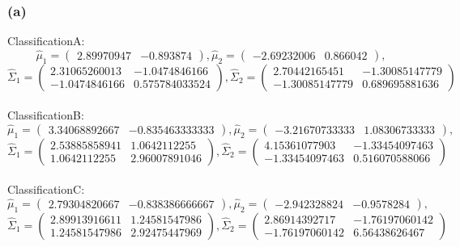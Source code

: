 \documentclass[9pt]{article}
\begin{document}
\subsubsection{(a)}
ClassificationA:
\[
\hat{\mu}_{1} =
  \begin{pmatrix}
    2.89970947 & -0.893874
  \end{pmatrix}, 
\hat{\mu}_{2} =
  \begin{pmatrix}
    -2.69232006 & 0.866042
  \end{pmatrix}, 
\]
\[
\hat{\Sigma}_{1} =
  \begin{pmatrix}
    2.31065260013 & -1.0474846166\\-1.0474846166 & 0.575784033524
  \end{pmatrix}, 
\hat{\Sigma}_{2} =
  \begin{pmatrix}
    2.70442165451 & -1.30085147779\\-1.30085147779 & 0.689695881636
  \end{pmatrix}
\]
\\
ClassificationB:
\[
\hat{\mu}_{1} =
  \begin{pmatrix}
    3.34068892667 & -0.835463333333
  \end{pmatrix}, 
\hat{\mu}_{2} =
  \begin{pmatrix}
    -3.21670733333 & 1.08306733333
  \end{pmatrix}, 
\]
\[
\hat{\Sigma}_{1} =
  \begin{pmatrix}
    2.53885858941 & 1.0642112255\\1.0642112255 & 2.96007891046
  \end{pmatrix}, 
\hat{\Sigma}_{2} =
  \begin{pmatrix}
    4.15361077903 & -1.33454097463\\-1.33454097463 & 0.516070588066
  \end{pmatrix}
\]
\\
ClassificationC:
\[
\hat{\mu}_{1} =
  \begin{pmatrix}
    2.79304820667 & -0.838386666667
  \end{pmatrix}, 
\hat{\mu}_{2} =
  \begin{pmatrix}
    -2.942328824 & -0.9578284
  \end{pmatrix}, 
\]
\[
\hat{\Sigma}_{1} =
  \begin{pmatrix}
    2.89913916611 & 1.24581547986\\1.24581547986 & 2.92475447969
  \end{pmatrix}, 
\hat{\Sigma}_{2} =
  \begin{pmatrix}
    2.86914392717 & -1.76197060142\\-1.76197060142 & 6.56438626467
  \end{pmatrix}
\]
\end{document}
